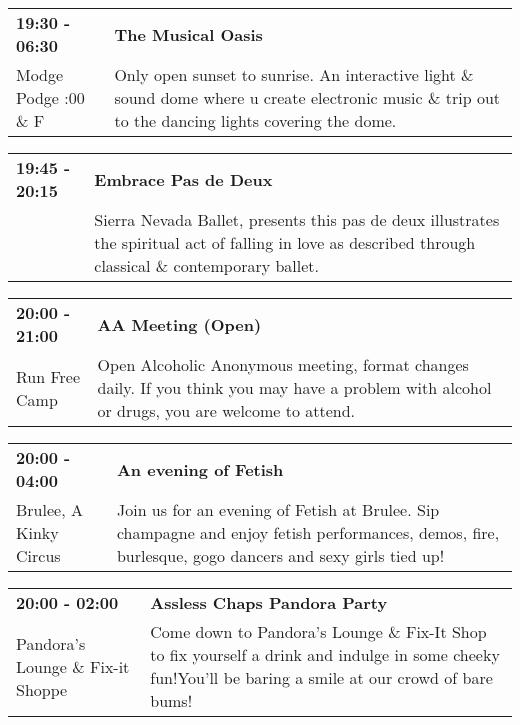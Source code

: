 \begin{tabular}{ p{1in} p{2.2in} }
    \textbf{19:30 - 06:30} & \textbf{The Musical Oasis} \\
    Modge Podge \newline 9:00 \& F & Only open sunset to sunrise.  An interactive light \& sound dome where u create electronic music \& trip out to the dancing lights covering the dome. \\
    \hline 
\end{tabular}
    
\begin{tabular}{ p{1in} p{2.2in} }
    \textbf{19:45 - 20:15} & \textbf{Embrace Pas de Deux} \\
    ~ \newline  & Sierra Nevada Ballet, presents this pas de deux illustrates the spiritual act of falling in love as described through classical \& contemporary ballet. \\
    \hline 
\end{tabular}
    
\begin{tabular}{ p{1in} p{2.2in} }
    \textbf{20:00 - 21:00} & \textbf{AA Meeting (Open)} \\
    Run Free Camp \newline  & Open Alcoholic Anonymous meeting, format changes daily. If you think you may have a problem with alcohol or drugs, you are welcome to attend. \\
    \hline 
\end{tabular}
    
\begin{tabular}{ p{1in} p{2.2in} }
    \textbf{20:00 - 04:00} & \textbf{An evening of Fetish} \\
    Brulee, A Kinky Circus \newline  & Join us for an evening of Fetish at Brulee. Sip champagne and enjoy fetish performances, demos, fire, burlesque, gogo dancers and sexy girls tied up! \\
    \hline 
\end{tabular}
    
\begin{tabular}{ p{1in} p{2.2in} }
    \textbf{20:00 - 02:00} & \textbf{Assless Chaps Pandora Party} \\
    Pandora's Lounge \& Fix-it Shoppe \newline  & Come down to Pandora's Lounge \& Fix-It Shop to fix yourself a drink and indulge in some cheeky fun!You'll be baring a smile at our crowd of bare bums! \\
    \hline 
\end{tabular}
    
